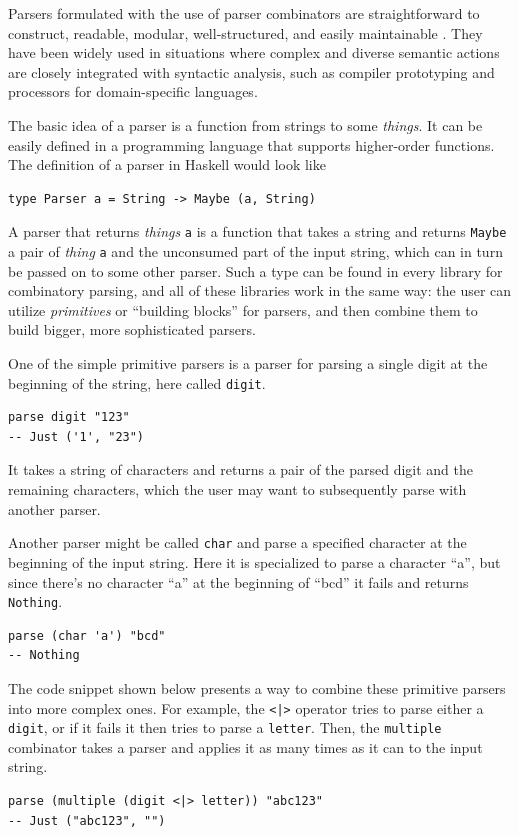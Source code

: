 \documentclass[english,bachelors,forcepolishlogotype]{wizthesis}
\begin{document}
Parsers formulated with the use of parser combinators are straightforward to
construct, readable, modular, well-structured, and easily maintainable
\cite{swierstra-2009}. They have been widely used in situations where complex
and diverse semantic actions are closely integrated with syntactic analysis,
such as compiler prototyping and processors for domain-specific languages.

The basic idea of a parser is a function from strings to some \emph{things}. It
can be easily defined in a programming language that supports higher-order
functions. The definition of a parser in Haskell would look like
\begin{verbatim}
type Parser a = String -> Maybe (a, String)
\end{verbatim}
A parser that returns \emph{things} \texttt{a} is a function that takes a string
and returns \texttt{Maybe} a pair of \emph{thing} \texttt{a} and the unconsumed
part of the input string, which can in turn be passed on to some other parser.
Such a type can be found in every library for combinatory parsing, and all of
these libraries work in the same way: the user can utilize \emph{primitives} or
``building blocks'' for parsers, and then combine them to build bigger, more
sophisticated parsers.

One of the simple primitive parsers is a parser for parsing a single digit at
the beginning of the string, here called \texttt{digit}.
\begin{verbatim}
parse digit "123"
-- Just ('1', "23")
\end{verbatim}
It takes a string of characters and returns a pair of the parsed digit and the
remaining characters, which the user may want to subsequently parse with another
parser.

Another parser might be called \texttt{char} and parse a specified character at
the beginning of the input string. Here it is specialized to parse a character
``a'', but since there's no character ``a'' at the beginning of ``bcd'' it fails
and returns \texttt{Nothing}.
\begin{verbatim}
parse (char 'a') "bcd"
-- Nothing
\end{verbatim}

The code snippet shown below presents a way to combine these primitive parsers
into more complex ones. For example, the \texttt{<|>} operator tries to parse
either a \texttt{digit}, or if it fails it then tries to parse a
\texttt{letter}. Then, the \texttt{multiple} combinator takes a parser and
applies it as many times as it can to the input string.
\begin{verbatim}
parse (multiple (digit <|> letter)) "abc123"
-- Just ("abc123", "")
\end{verbatim}
\end{document}
